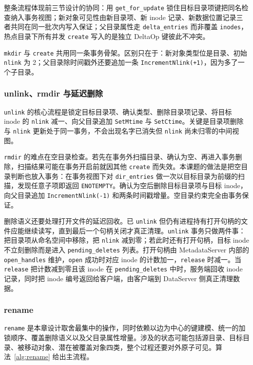 整条流程体现前三节设计的协同：用 \texttt{get\_for\_update} 锁住目标目录项键把同名检查纳入事务视图；新对象可见性由新目录项、新 inode 记录、新数据位置记录三者共同在同一批次内写入保证；父目录属性走 \texttt{delta\_entries} 而非覆盖 \texttt{inodes}，热点目录下所有并发 \texttt{create} 写入的是独立 DeltaOp 键彼此不冲突。

\texttt{mkdir} 与 \texttt{create} 共用同一条事务骨架。区别只在于：新对象类型位是目录、初始 \texttt{nlink} 为 2；父目录除时间戳外还要追加一条 \texttt{IncrementNlink(+1)}，因为多了一个子目录。

\subsubsection{unlink、rmdir 与延迟删除}

\texttt{unlink} 的核心流程是锁定目标目录项、确认类型、删除目录项记录、将目标 inode 的 \texttt{nlink} 减一、向父目录追加 \texttt{SetMtime} 与 \texttt{SetCtime}。关键是目录项删除与 \texttt{nlink} 更新处于同一事务，不会出现名字已消失但 \texttt{nlink} 尚未归零的中间视图。

\texttt{rmdir} 的难点在空目录检查。若先在事务外扫描目录、确认为空、再进入事务删除，扫描结果可能在事务开启前就因其他 \texttt{create} 而失效。本课题的做法是把空目录判断也放入事务：在事务视图下对 \texttt{dir\_entries} 做一次以目标目录为前缀的扫描，发现任意子项即返回 \texttt{ENOTEMPTY}。确认为空后删除目标目录项与目标 inode，向父目录追加 \texttt{IncrementNlink(-1)} 和两条时间戳增量。空目录约束完全由事务保证。

删除语义还要处理打开文件的延迟回收。已 \texttt{unlink} 但仍有进程持有打开句柄的文件应能继续读写，直到最后一个句柄关闭才真正清理。\texttt{unlink} 事务只做两件事：把目录项从命名空间中移除，把 \texttt{nlink} 减到零；若此时还有打开句柄，目标 inode 不立刻删除而是进入 \texttt{pending\_deletes} 列表。打开句柄由 MetadataServer 内部的 \texttt{open\_handles} 维护，\texttt{open} 成功时对应 inode 的计数加一，\texttt{release} 时减一。当 \texttt{release} 把计数减到零且该 inode 在 \texttt{pending\_deletes} 中时，服务端回收 inode 记录，同时把 inode 编号返回给客户端，由客户端到 DataServer 侧真正清理数据。

\subsubsection{rename}

\texttt{rename} 是本章设计取舍最集中的操作，同时依赖以边为中心的键建模、统一的加锁顺序、覆盖删除语义以及父目录属性增量。涉及的状态可能包括源目录、目标目录、被移动对象、潜在被覆盖对象四类，整个过程还要对外原子可见。算法~\ref{alg:rename} 给出主流程。

